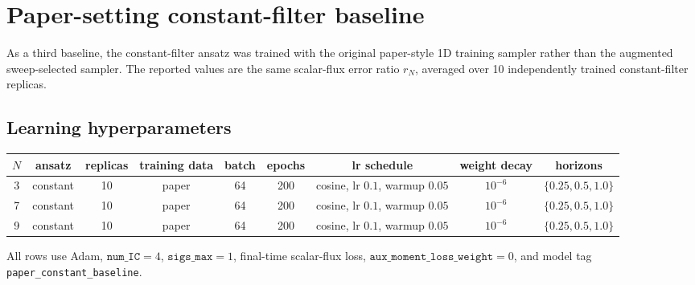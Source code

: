 \documentclass[10pt]{article}
\begin{document}
\clearpage
\section*{Paper-setting constant-filter baseline}
As a third baseline, the constant-filter ansatz was trained with the original
paper-style 1D training sampler rather than the augmented sweep-selected sampler.
The reported values are the same scalar-flux error ratio \(r_N\), averaged over
10 independently trained constant-filter replicas.

\subsection*{Learning hyperparameters}
\begin{center}
{\scriptsize
\begin{tabular}{c c c c c c c c c}
\toprule
\(N\) & ansatz & replicas & training data & batch & epochs & lr schedule & weight decay & horizons \\
\midrule
3 & constant & 10 & paper & 64 & 200 & cosine, lr \(0.1\), warmup \(0.05\) & \(10^{-6}\) & \(\{0.25,0.5,1.0\}\) \\
7 & constant & 10 & paper & 64 & 200 & cosine, lr \(0.1\), warmup \(0.05\) & \(10^{-6}\) & \(\{0.25,0.5,1.0\}\) \\
9 & constant & 10 & paper & 64 & 200 & cosine, lr \(0.1\), warmup \(0.05\) & \(10^{-6}\) & \(\{0.25,0.5,1.0\}\) \\
\bottomrule
\end{tabular}
}
\end{center}
All rows use Adam, \(\texttt{num\_IC}=4\), \(\texttt{sigs\_max}=1\), final-time
scalar-flux loss, \(\texttt{aux\_moment\_loss\_weight}=0\), and model tag
\texttt{paper\_constant\_baseline}.
\end{document}
